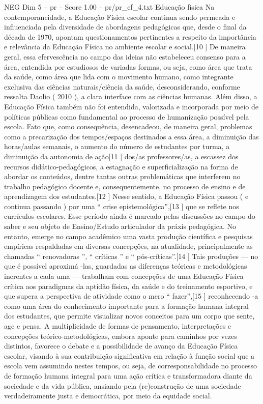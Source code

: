 \begin{textsample}{NEG Dim 5 – pr – Score 1.00 – pr/pr\_ef\_4.txt}  \label{ex:f5_neg_238}
Educação física Na contemporaneidade, a Educação Física escolar continua sendo permeada e influenciada pela diversidade de abordagens pedagógicas que, desde o final da década de 1970, apontam questionamentos pertinentes a respeito da importância e relevância da Educação Física no ambiente escolar e social.[10 ] De maneira geral, essa efervescência no campo das ideias não estabeleceu consenso para a área, entendida por estudiosos de variadas formas, ou seja, como área que trata da saúde, como área que lida com o movimento humano, como integrante exclusiva das ciências naturais/ciência da saúde, desconsiderando, conforme ressalta Daolio ( 2010 ), a clara interface com as ciências humanas.
Além disso, a Educação Física também não foi entendida, valorizada e incorporada por meio de políticas públicas como fundamental ao processo de humanização possível pela escola.
Fato que, como consequência, desencadeou, de maneira geral, problemas como a precarização dos tempos/espaços destinados a essa área, a diminuição das horas/aulas semanais, o aumento do número de estudantes por turma, a diminuição da autonomia de ação[11 ] dos/as professores/as, a escassez dos recursos didático-pedagógicos, a estagnação e superficialização na forma de abordar os conteúdos, dentre tantas outras problemáticas que interferem no trabalho pedagógico docente e, consequentemente, no processo de ensino e de aprendizagem dos estudantes.[12 ] Nesse sentido, a Educação Física passou ( e continua passando ) por uma “ crise epistemológica”,[13 ] que se reflete nos currículos escolares.
Esse período ainda é marcado pelas discussões no campo do saber e seu objeto de Ensino/Estudo articulador da práxis pedagógica.
No entanto, emerge no campo acadêmico uma vasta produção científica e pesquisas empíricas respaldadas em diversas concepções, na atualidade, principalmente as chamadas “ renovadoras ”, “ críticas ” e “ pós-críticas”.[14 ] Tais produções — no que é possível aproximá -las, guardadas as diferenças teóricas e metodológicas inerentes a cada uma — trabalham com concepções de uma Educação Física crítica aos paradigmas da aptidão física, da saúde e do treinamento esportivo, e que supera a perspectiva de atividade como o mero “ fazer”,[15 ] reconhecendo -a como uma área do conhecimento importante para a formação humana integral dos estudantes, que permite visualizar novos conceitos para um corpo que sente, age e pensa.
A multiplicidade de formas de pensamento, interpretações e concepções teórico-metodológicas, embora aponte para caminhos por vezes distintos, favorece o debate e a possibilidade de avanço da Educação Física escolar, visando à sua contribuição significativa em relação à função social que a escola vem assumindo nestes tempos, ou seja, de corresponsabilidade no processo de formação humana integral para uma ação crítica e transformadora diante da sociedade e da vida pública, ansiando pela (re)construção de uma sociedade verdadeiramente justa e democrática, por meio da equidade social.

\end{textsample}
